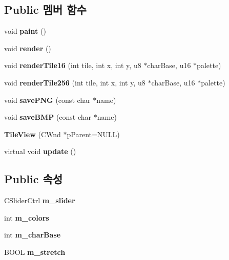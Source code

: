 \subsection*{Public 멤버 함수}
\begin{DoxyCompactItemize}
\item 
\mbox{\label{class_tile_view_a4341071a0cab0d5a8b6dfa7318230636}} 
void {\bfseries paint} ()
\item 
\mbox{\label{class_tile_view_a4b8f6e14f8ee7d4abea3a751cb5f7d74}} 
void {\bfseries render} ()
\item 
\mbox{\label{class_tile_view_abc4f9051fc3c2bfad76a6b11787460f8}} 
void {\bfseries render\+Tile16} (int tile, int x, int y, u8 $\ast$char\+Base, u16 $\ast$palette)
\item 
\mbox{\label{class_tile_view_a1232e131b9ef993edea4390809c41814}} 
void {\bfseries render\+Tile256} (int tile, int x, int y, u8 $\ast$char\+Base, u16 $\ast$palette)
\item 
\mbox{\label{class_tile_view_a43f168cd426f0e9215f55c742b6826e7}} 
void {\bfseries save\+P\+NG} (const char $\ast$name)
\item 
\mbox{\label{class_tile_view_aaea86e952981c5622d400ffb57b30480}} 
void {\bfseries save\+B\+MP} (const char $\ast$name)
\item 
\mbox{\label{class_tile_view_a870ab4767d06b82a3537dd5aaf7697c1}} 
{\bfseries Tile\+View} (C\+Wnd $\ast$p\+Parent=N\+U\+LL)
\item 
\mbox{\label{class_tile_view_a09b04d6b0135ef2b6da3c08796c1d354}} 
virtual void {\bfseries update} ()
\end{DoxyCompactItemize}
\subsection*{Public 속성}
\begin{DoxyCompactItemize}
\item 
\mbox{\label{class_tile_view_a3423f8bf0fe4b1bd0273d9ffbd3fb390}} 
C\+Slider\+Ctrl {\bfseries m\+\_\+slider}
\item 
\mbox{\label{class_tile_view_ad61048a17d2a93f3b8cb413d17a1533a}} 
int {\bfseries m\+\_\+colors}
\item 
\mbox{\label{class_tile_view_a1fd549925ae533d9ce7215b8d5de4c63}} 
int {\bfseries m\+\_\+char\+Base}
\item 
\mbox{\label{class_tile_view_a21a8f1dc56ad2e1107719d64fb206d2e}} 
B\+O\+OL {\bfseries m\+\_\+stretch}
\end{DoxyCompactItemize}
